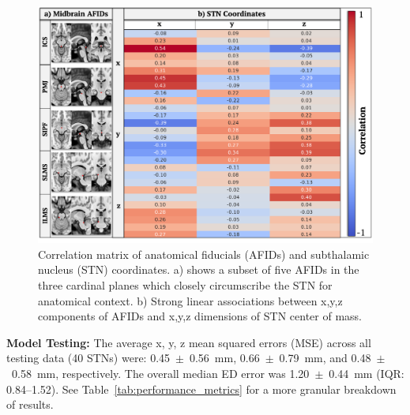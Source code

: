 \begin{figure}[hbt!]
    \centering
    \includegraphics[width=1\linewidth]{figs/ch4_Figure_stncor.png}
    \caption{Correlation matrix of anatomical fiducials (AFIDs) and subthalamic nucleus (STN) coordinates. a) shows a subset of five AFIDs in the three cardinal planes which closely circumscribe the STN for anatomical context. b) Strong linear associations between x,y,z components of AFIDs and x,y,z dimensions of STN center of mass. }
    \label{fig:ch4_Figure_stncor}
\end{figure}

\textbf{Model Testing:} The average x, y, z mean squared errors (MSE) across all testing data (40 STNs) were: 0.45~$\pm$~0.56~mm, 0.66~$\pm$~0.79~mm, and 0.48~$\pm$~0.58~mm, respectively. The overall median ED error was 1.20~$\pm$~0.44~mm (IQR: 0.84–1.52). See Table~\ref{tab:performance_metrics} for a more granular breakdown of results.

